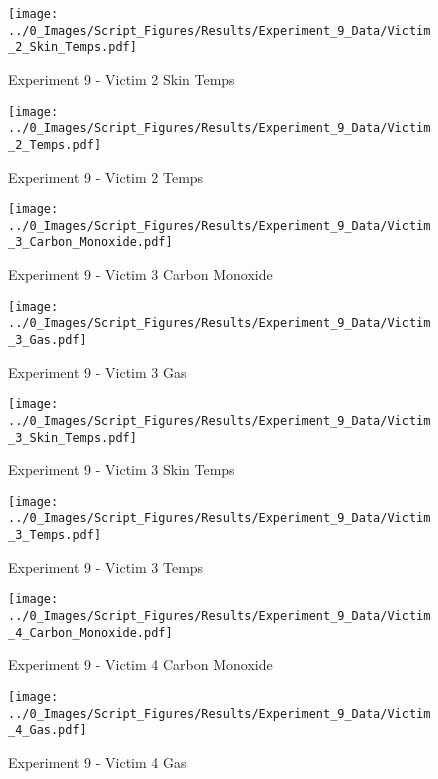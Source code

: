	\clearpage

	\begin{figure}[H]
		\centering
		\texttt{[image: ../0\_Images/Script\_Figures/Results/Experiment\_9\_Data/Victim\_2\_Skin\_Temps.pdf]}
		\caption[]{Experiment 9 - Victim 2 Skin Temps}
	\end{figure}
 

	\begin{figure}[H]
		\centering
		\texttt{[image: ../0\_Images/Script\_Figures/Results/Experiment\_9\_Data/Victim\_2\_Temps.pdf]}
		\caption[]{Experiment 9 - Victim 2 Temps}
	\end{figure}
 
	\clearpage

	\begin{figure}[H]
		\centering
		\texttt{[image: ../0\_Images/Script\_Figures/Results/Experiment\_9\_Data/Victim\_3\_Carbon\_Monoxide.pdf]}
		\caption[]{Experiment 9 - Victim 3 Carbon Monoxide}
	\end{figure}
 

	\begin{figure}[H]
		\centering
		\texttt{[image: ../0\_Images/Script\_Figures/Results/Experiment\_9\_Data/Victim\_3\_Gas.pdf]}
		\caption[]{Experiment 9 - Victim 3 Gas}
	\end{figure}
 
	\clearpage

	\begin{figure}[H]
		\centering
		\texttt{[image: ../0\_Images/Script\_Figures/Results/Experiment\_9\_Data/Victim\_3\_Skin\_Temps.pdf]}
		\caption[]{Experiment 9 - Victim 3 Skin Temps}
	\end{figure}
 

	\begin{figure}[H]
		\centering
		\texttt{[image: ../0\_Images/Script\_Figures/Results/Experiment\_9\_Data/Victim\_3\_Temps.pdf]}
		\caption[]{Experiment 9 - Victim 3 Temps}
	\end{figure}
 
	\clearpage

	\begin{figure}[H]
		\centering
		\texttt{[image: ../0\_Images/Script\_Figures/Results/Experiment\_9\_Data/Victim\_4\_Carbon\_Monoxide.pdf]}
		\caption[]{Experiment 9 - Victim 4 Carbon Monoxide}
	\end{figure}
 

	\begin{figure}[H]
		\centering
		\texttt{[image: ../0\_Images/Script\_Figures/Results/Experiment\_9\_Data/Victim\_4\_Gas.pdf]}
		\caption[]{Experiment 9 - Victim 4 Gas}
	\end{figure}
 
